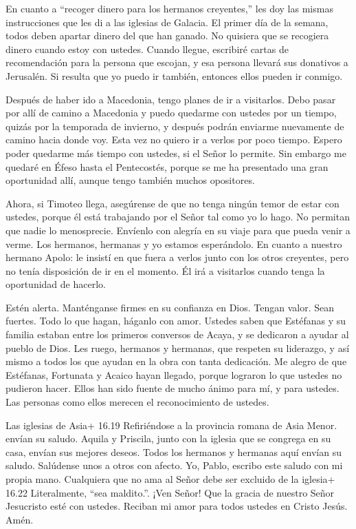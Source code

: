  En cuanto a ``recoger dinero para los hermanos creyentes,''
les doy las mismas instrucciones que les di a las iglesias de Galacia.
 El primer día de la semana, todos deben apartar dinero del
que han ganado. No quisiera que se recogiera dinero cuando estoy con
ustedes.  Cuando llegue, escribiré cartas de recomendación
para la persona que escojan, y esa persona llevará sus donativos a
Jerusalén.  Si resulta que yo puedo ir también, entonces
ellos pueden ir conmigo.

 Después de haber ido a Macedonia, tengo planes de ir a
visitarlos. Debo pasar por allí de camino a Macedonia  y
puedo quedarme con ustedes por un tiempo, quizás por la temporada de
invierno, y después podrán enviarme nuevamente de camino hacia donde
voy.  Esta vez no quiero ir a verlos por poco tiempo. Espero
poder quedarme más tiempo con ustedes, si el Señor lo permite.
 Sin embargo me quedaré en Éfeso hasta el Pentecostés,
 porque se me ha presentado una gran oportunidad allí,
aunque tengo también muchos opositores.

 Ahora, si Timoteo llega, asegúrense de que no tenga ningún
temor de estar con ustedes, porque él está trabajando por el Señor tal
como yo lo hago.  No permitan que nadie lo menosprecie.
Envíenlo con alegría en su viaje para que pueda venir a verme. Los
hermanos, hermanas y yo estamos esperándolo.  En cuanto a
nuestro hermano Apolo: le insistí en que fuera a verlos junto con los
otros creyentes, pero no tenía disposición de ir en el momento. Él irá a
visitarlos cuando tenga la oportunidad de hacerlo.

 Estén alerta. Manténganse firmes en su confianza en Dios.
Tengan valor. Sean fuertes.  Todo lo que hagan, háganlo con
amor.  Ustedes saben que Estéfanas y su familia estaban
entre los primeros conversos de Acaya, y se dedicaron a ayudar al pueblo
de Dios. Les ruego, hermanos y hermanas,  que respeten su
liderazgo, y así mismo a todos los que ayudan en la obra con tanta
dedicación.  Me alegro de que Estéfanas, Fortunata y Acaico
hayan llegado, porque lograron lo que ustedes no pudieron hacer.
 Ellos han sido fuente de mucho ánimo para mí, y para
ustedes. Las personas como ellos merecen el reconocimiento de ustedes.

 Las iglesias de Asia+ 16.19 Refiriéndose a la provincia
romana de Asia Menor. envían su saludo. Aquila y Priscila, junto con la
iglesia que se congrega en su casa, envían sus mejores deseos.
 Todos los hermanos y hermanas aquí envían su saludo.
Salúdense unos a otros con afecto.  Yo, Pablo, escribo este
saludo con mi propia mano.  Cualquiera que no ama al Señor
debe ser excluido de la iglesia+ 16.22 Literalmente, ``sea maldito.''.
¡Ven Señor!  Que la gracia de nuestro Señor Jesucristo esté
con ustedes.  Reciban mi amor para todos ustedes en Cristo
Jesús. Amén.
